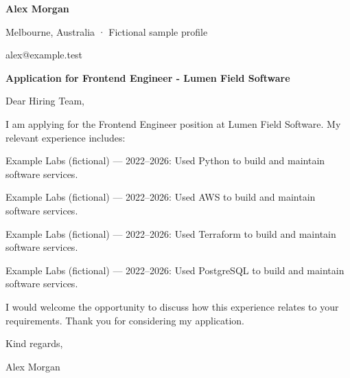 \documentclass[10pt,a4paper]{article}
\begin{document}
{\LARGE\bfseries\color{navy} Alex Morgan}\par
Melbourne, Australia · Fictional sample profile\par
alex@example.test\par
{\large\bfseries\color{navy} Application for Frontend Engineer - Lumen Field Software}\par
Dear Hiring Team,\par
I am applying for the Frontend Engineer position at Lumen Field Software. My relevant experience includes:\par
Example Labs (fictional) — 2022–2026: Used Python to build and maintain software services.\par
Example Labs (fictional) — 2022–2026: Used AWS to build and maintain software services.\par
Example Labs (fictional) — 2022–2026: Used Terraform to build and maintain software services.\par
Example Labs (fictional) — 2022–2026: Used PostgreSQL to build and maintain software services.\par
I would welcome the opportunity to discuss how this experience relates to your requirements. Thank you for considering my application.\par
Kind regards,\par
Alex Morgan\par
\end{document}
